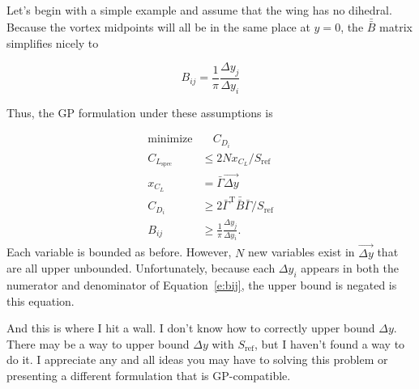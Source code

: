 \documentclass[10pt, a4paper]{article}
\begin{document}
Let's begin with a simple example and assume that the wing has no dihedral.  Because the vortex midpoints will all be in the same place at $y=0$, the $\bar{\bar{B}}$ matrix simplifies nicely to

\begin{equation}
    B_{ij} = \frac{1}{\pi} \frac{\Delta y_j}{\Delta y_i}
\end{equation}

Thus, the GP formulation under these assumptions is

\begin{align}
    \text{minimize} & \quad C_{D_i} \nonumber \\
    C_{L_{\mathrm{spec}}} &\leq 2 N x_{C_L}/S_{\mathrm{ref}} \\
    x_{C_L} &= \bar{\Gamma} \vec{\Delta y} \\
    C_{D_i} &\geq 2 \bar{\Gamma}^{\mathrm{T}} \bar{\bar{B}} \bar{\Gamma}/S_{\mathrm{ref}} \\
    \label{e:bij}
    B_{ij} &\geq \frac{1}{\pi} \frac{\Delta y_j}{\Delta y_i}.
\end{align}
Each variable is bounded as before.  However, $N$ new variables exist in $\vec{\Delta y}$ that are all upper unbounded.  Unfortunately, because each $\Delta y_i$ appears in both the numerator and denominator of Equation~\ref{e:bij}, the upper bound is negated is this equation. 

And this is where I hit a wall.  I don't know how to correctly upper bound $\Delta y$. There may be a way to upper bound $\Delta y$ with $S_{\mathrm{ref}}$, but I haven't found a way to do it.  I appreciate any and all ideas you may have to solving this problem or presenting a different formulation that is GP-compatible. 
\end{document}
